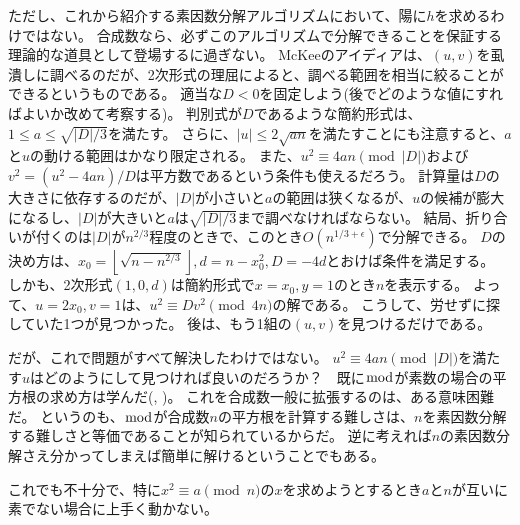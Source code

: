 ただし、これから紹介する素因数分解アルゴリズムにおいて、陽に$h$を求めるわけではない。
合成数なら、必ずこのアルゴリズムで分解できることを保証する理論的な道具として登場するに過ぎない。
McKee\cite{10.1112/blms/28.4.351}のアイディアは、$(u,v)$を虱潰しに調べるのだが、2次形式の理屈によると、調べる範囲を相当に絞ることができるというものである。
適当な$D<0$を固定しよう(後でどのような値にすればよいか改めて考察する)。
判別式が$D$であるような簡約形式は、$1\le a\le\sqrt{|D|/3}$を満たす。
さらに、$|u|\le2\sqrt{an}$を満たすことにも注意すると、$a$と$u$の動ける範囲はかなり限定される。
また、$u^2\equiv4an\pmod{|D|}$および$v^2=(u^2-4an)/D$は平方数であるという条件も使えるだろう。
計算量は$D$の大きさに依存するのだが、$|D|$が小さいと$a$の範囲は狭くなるが、$u$の候補が膨大になるし、$|D|$が大きいと$a$は$\sqrt{|D|/3}$まで調べなければならない。
結局、折り合いが付くのは$|D|$が$n^{2/3}$程度のときで、このとき$O(n^{1/3+\epsilon})$で分解できる。
$D$の決め方は、$x_0=\left \lfloor \sqrt{n-n^{2/3}} \right \rfloor, d=n-x_0^2, D=-4d$とおけば条件を満足する。
しかも、2次形式$(1,0,d)$は簡約形式で$x=x_0,y=1$のとき$n$を表示する。
よって、$u=2x_0,v=1$は、$u^2 \equiv Dv^2 \pmod{4n}$の解である。
こうして、労せずに探していた1つが見つかった。
後は、もう1組の$(u,v)$を見つけるだけである。

だが、これで問題がすべて解決したわけではない。
$u^2\equiv4an\pmod{|D|}$を満たす$u$はどのようにして見つければ良いのだろうか？　既に$\bmod$が素数の場合の平方根の求め方は学んだ(, )。
これを合成数一般に拡張するのは、ある意味困難だ。
というのも、$\bmod$が合成数$n$の平方根を計算する難しさは、$n$を素因数分解する難しさと等価であることが知られているからだ。
逆に考えれば$n$の素因数分解さえ分かってしまえば簡単に解けるということでもある。


これでも不十分で、特に$x^2\equiv a\pmod{n}$の$x$を求めようとするとき$a$と$n$が互いに素でない場合に上手く動かない。

